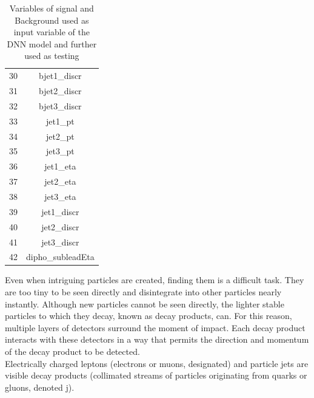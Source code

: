 \begin{table}[h!]
{\begin{tabular}{|c|c|}
                                  30  & bjet1\_discr\\
                                    31  & bjet2\_discr \\ 
                                    32 & bjet3\_discr \\
                                   33  &   jet1\_pt \\
                                    34  &  jet2\_pt  \\
                                   35    &  jet3\_pt  \\
                                  36      &  jet1\_eta  \\
                                 37        & jet2\_eta   \\
                                 38         &  jet3\_eta  \\
                                    39       &  jet1\_discr  \\
                                      40      &  jet2\_discr  \\
                                       41      &   jet3\_discr \\
                                       42       &  dipho\_subleadEta  \\
                                    
                                    
                                    
                                    \hline
           
    \end{tabular}}
    \caption{Variables of signal and Background used as input variable of the DNN model and further used as testing}
    \label{tab:my_label_Variable}
\end{table}





Even when intriguing particles are created, finding them is a difficult task. They are too tiny to be seen directly and disintegrate into other particles nearly instantly. Although new particles cannot be seen directly, the lighter stable particles to which they decay, known as decay products, can. For this reason, multiple layers of detectors surround the moment of impact. Each decay product interacts with these detectors in a way that permits the direction and momentum of the decay product to be detected. \\
Electrically charged leptons (electrons or muons, designated) and particle jets are visible decay products (collimated streams of particles originating from quarks or gluons, denoted j).


